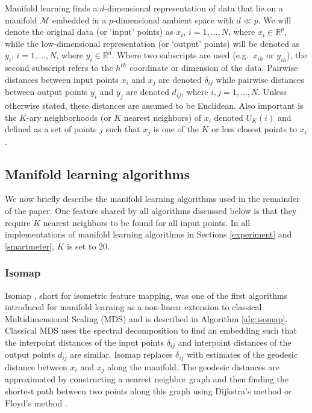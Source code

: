 \documentclass[11pt,a4paper,]{article}
\begin{document}
Manifold learning finds a \(d\)-dimensional representation of data that lie on a manifold \(\mathcal{M}\) embedded in a \(p\)-dimensional ambient space with \(d \ll p\). We will denote the original data (or `input' points) as \(x_i\), \(i=1,\dots,N\), where \(x_i\in\mathbb{R}^p\), while the low-dimensional representation (or `output' points) will be denoted as \(y_i\), \(i=1,\dots,N\), where \(y_i\in\mathbb{R}^d\). Where two subscripts are used (e.g.~\(x_{ih}\) or \(y_{ih}\)), the second subscript refers to the \(h^{th}\) coordinate or dimension of the data. Pairwise distances between input points \(x_i\) and \(x_j\) are denoted \(\delta_{ij}\) while pairwise distances between output points \(y_i\) and \(y_j\) are denoted \(d_{ij}\), where \(i,j=1,\dots,N\). Unless otherwise stated, these distances are assumed to be Euclidean. Also important is the \(K\)-ary neighborhoods (or \(K\) nearest neighbors) of \(x_i\) denoted \(U_K(i)\) and defined as a set of points \(j\) such that \(x_j\) is one of the \(K\) or less closest points to \(x_i\).

\hypertarget{ml}{%
\subsection{Manifold learning algorithms}\label{ml}}

We now briefly describe the manifold learning algorithms used in the remainder of the paper. One feature shared by all algorithms discussed below is that they require \(K\) nearest neighbors to be found for all input points. In all implementations of manifold learning algorithms in Sections \ref{experiment} and \ref{smartmeter}, \(K\) is set to 20.

\hypertarget{isomap}{%
\subsubsection*{Isomap}\label{isomap}}

Isomap \autocite{Tenenbaum2000-fr}, short for isometric feature mapping, was one of the first algorithms introduced for manifold learning as a non-linear extension to classical Multidimensional Scaling (MDS) and is described in Algorithm \ref{alg:isomap}. Classical MDS uses the spectral decomposition to find an embedding such that the interpoint distances of the input points \(\delta_{ij}\) and interpoint distances of the output points \(d_{ij}\) are similar. Isomap replaces \(\delta_{ij}\) with estimates of the geodesic distance between \(x_i\) and \(x_j\) along the manifold. The geodesic distances are approximated by constructing a nearest neighbor graph and then finding the shortest path between two points along this graph using Dijkstra's method \autocite{Dijkstra1959-ml} or Floyd's method \autocite{FloydRobert1962-au}.
\end{document}
